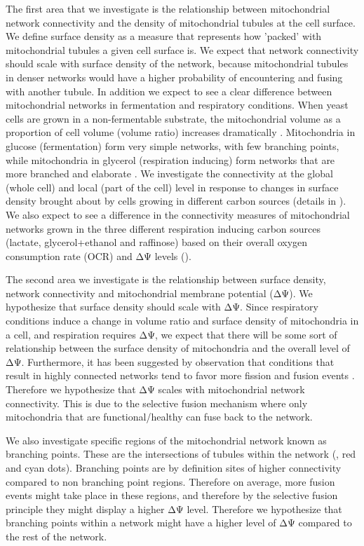 The first area that we investigate is the relationship between mitochondrial network connectivity and the density of mitochondrial tubules at the cell surface. We define surface density as a measure that represents how 'packed' with mitochondrial tubules a given cell surface is. We expect that network connectivity should scale with surface density of the network, because mitochondrial tubules in denser networks would have a higher probability of encountering and fusing with another tubule. In addition we expect to see a clear difference between mitochondrial networks in fermentation and respiratory conditions. When yeast cells are grown in a non-fermentable substrate, the mitochondrial volume as a proportion of cell volume (volume ratio) increases dramatically \cite{jakobs_spatial_2003}. Mitochondria in glucose (fermentation) form very simple networks, with few branching points, while mitochondria in glycerol (respiration inducing) form networks that are more branched and elaborate \cite{egner_fast_2002}. We investigate the connectivity at the global (whole cell) and local (part of the cell) level in response to changes in surface density brought about by cells growing in different carbon sources (details in ).  We also expect to see a difference in the connectivity measures of mitochondrial networks grown in the three different respiration inducing carbon sources (lactate, glycerol+ethanol and raffinose) based on their overall oxygen consumption rate (OCR) and ΔΨ levels (). 

The second area we investigate is the relationship between surface density, network connectivity and mitochondrial membrane potential (ΔΨ). We hypothesize that surface density should scale with ΔΨ. Since respiratory conditions induce a change in volume ratio and surface density of mitochondria in a cell, and respiration requires ΔΨ, we expect that there will be some sort of relationship between the surface density of mitochondria and the overall level of ΔΨ. Furthermore, it has been suggested by observation that conditions that result in highly connected networks tend to favor more fission and fusion events \cite{jakobs_spatial_2003}. Therefore we hypothesize that ΔΨ scales with mitochondrial network connectivity. This is due to the selective fusion mechanism where only mitochondria that are functional/healthy can fuse back to the network. 

We also investigate specific regions of the mitochondrial network known as branching points. These are the intersections of tubules within the network (, red and cyan dots). Branching points are by definition sites of higher connectivity compared to non branching point regions. Therefore on average, more fusion events might take place in these regions, and therefore by the selective fusion principle they might display a higher ΔΨ level. Therefore we hypothesize that branching points within a network might have a higher level of ΔΨ compared to the rest of the network.

